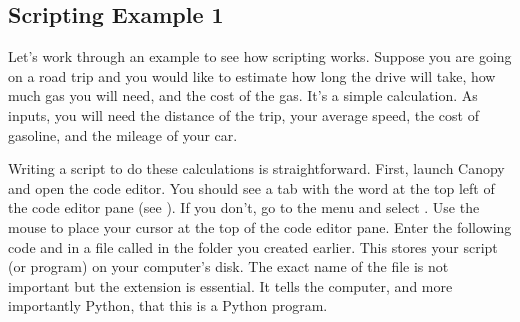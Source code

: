 \documentclass[letterpaper,10pt,english]{sphinxmanual}
\begin{document}
\subsection{Scripting Example 1}
\label{\detokenize{chap2/chap2_basics:scripting-example-1}}\label{\detokenize{chap2/chap2_basics:chap2-scriptexmp1}}
\sphinxAtStartPar
Let’s work through an example to see how scripting works.  Suppose you are going on a road trip and you would like to estimate how long the drive will take, how much gas you will need, and the cost of the gas.  It’s a simple calculation.  As inputs, you will need the distance of the trip, your average speed, the cost of gasoline, and the mileage of your car.

\sphinxAtStartPar
Writing a script to do these calculations is straightforward.  First, launch Canopy and open the code editor.  You should see a tab with the word  at the top left of the code editor pane (see {\hyperref[\detokenize{chap2/chap2_basics:fig-canopywindow}]{}}).  If you don’t, go to the  menu and select .  Use the mouse to place your cursor at the top of the code editor pane.  Enter the following code and  in a file called  in the  folder you created earlier.  This stores your script (or program) on your computer’s disk.  The exact name of the file is not important but the extension  is essential.  It tells the computer, and more importantly Python, that this is a Python program.

\begin{sphinxVerbatim}[commandchars=\\\{\},numbers=left,firstnumber=1,stepnumber=1]
           
                 
               
      

  
  
  
\end{sphinxVerbatim}
\end{document}
